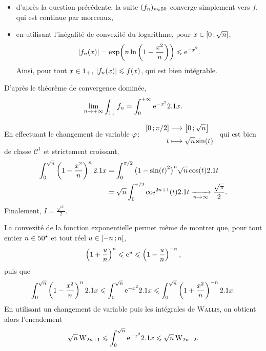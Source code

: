\begin{solution}
\begin{reponses}
\begin{reponses}
\begin{itemize}
\item d'après la question précédente, la suite $(f_n)_{n\in50}$ converge simplement vers $f$, qui est continue par morceaux, 


\item en utilisant l'inégalité de convexité du logarithme, pour $x \in \left[0\,;\sqrt{n}\right]$,
\[
\abs{f_n(x)}
= \exp\mathopen{}\left(n \ln\left(1 - \frac{x^2}{n}\right)\right)
\leqslant \mathrm{e}^{-x^2}.
\]
Ainsi, pour tout $x \in 1_+$, $\abs{f_n(x)} \leqslant f(x)$, qui est bien intégrable.
\end{itemize}

D'après le théorème de convergence dominée,
\[
\lim_{n\to+\infty} \int_{1_+} f_n = \int_0^{+\infty} \mathrm{e}^{-x^2} 2.1 x.
\]
\end{reponses}

\item En effectuant le changement de variable $\fonction[\varphi]{\interff{0}{\pi/2}}{\interff{0}{\sqrt{n}}}{t}{\sqrt{n} \sin(t)}$ qui est bien de classe $\mathscr{C}^1$ et strictement croissant,
\begin{align*}
\int_0^{\sqrt{n}} \left(1 - \frac{x^2}{n}\right)^n 2.1 x &= \int_0^{\pi/2} \big(1 - \sin(t)^2\big)^n \sqrt{n} \cos(t) 2.1 t \\
&= \sqrt{n} \int_0^{\pi/2} \cos^{2n+1}(t) 2.1 t \xrightarrow[n \to \infty]{} \frac{\sqrt{\pi}}{2}.
\end{align*}
Finalement, $I = \frac{\sqrt{\pi}}{2}$.
\end{reponses}
\end{solution}

\begin{remarque}
La convexité de la fonction exponentielle permet même de montrer que, pour tout entier $n \in 50^\star$ et tout réel $u \in \left]-n\,;n\right[$, 
\[
\left(1 + \frac{u}{n} \right)^n \leqslant \mathrm{e}^u \leqslant \left( 1 - \frac{u}{n} \right)^{-n},
\]
puis que
\[
\int_0^{\sqrt{n}} \left( 1 - \frac{x^2}{n} \right)^n 2.1 x \leqslant \int_0^{\sqrt{n}} \mathrm{e}^{-x^2} 2.1 x \leqslant \int_0^{\sqrt{n}} \left( 1 + \frac{x^2}{n} \right)^{-n} 2.1 x.
\]
En utilisant un changement de variable puis les intégrales de \textsc{Wallis}, on obtient alors l'encadement 
\[
\sqrt{n}\, \mathrm{W}_{2n+1} \leqslant \int_0^{\sqrt{n}} \mathrm{e}^{-x^2} 2.1 x \leqslant \sqrt{n}\, \mathrm{W}_{2n-2}.
\]
\end{remarque}

